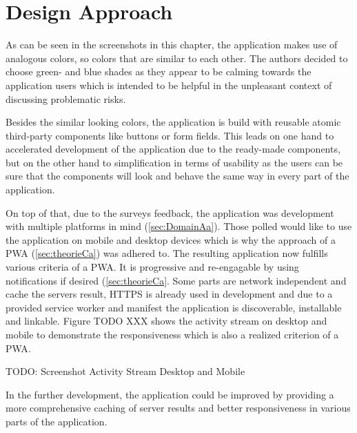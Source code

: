 
\section{Design Approach}
\label{sec:implementationDesign}

As can be seen in the screenshots in this chapter, the application makes use of analogous colors, so colors that are similar to each other. The authors decided to choose green- and blue shades as they appear to be calming towards the application users which is intended to be helpful in the unpleasant context of discussing problematic risks.

Besides the similar looking colors, the application is build with reusable atomic third-party components like buttons or form fields. This leads on one hand to accelerated development of the application due to the ready-made components, but on the other hand to simplification in terms of usability as the users can be sure that the components will look and behave the same way in every part of the application.

On top of that, due to the surveys feedback, the application was development with multiple platforms in mind (\ref{sec:DomainAa}). Those polled would like to use the application on mobile and desktop devices which is why the approach of a  \acs{PWA} (\ref{sec:theorieCa}) was adhered to. The resulting application now fulfills various criteria of a PWA. It is progressive and re-engagable by using notifications if desired (\ref{sec:theorieCa}. Some parts are network independent and cache the servers result, HTTPS is already used in development and due to a provided service worker and manifest the application is discoverable, installable and linkable. Figure TODO XXX shows the activity stream on desktop and mobile to demonstrate the responsiveness which is also a realized criterion of a  \acs{PWA}.

TODO: Screenshot Activity Stream Desktop and Mobile

In the further development, the application could be improved by providing a more comprehensive caching of server results and better responsiveness in various parts of the application.
